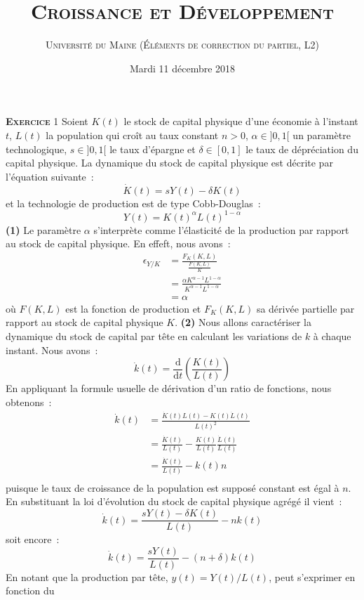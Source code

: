 \documentclass[10pt,a4paper,notitlepage,twocolumn]{article}
\newcommand{\exercice}[1]{\textsc{\textbf{Exercice}} #1}
\newcommand{\question}[1]{\textbf{(#1)}}
\begin{document}
\title{\textsc{Croissance et Développement}}
\author{\textsc{Université du Maine (Éléments de correction du partiel, L2)}}
\date{Mardi 11 décembre 2018}

\maketitle
\thispagestyle{empty}


\exercice{1} Soient $K(t)$ le stock de capital physique d'une économie
à l'instant $t$, $L(t)$ la population qui croît au taux constant
$n>0$, $\alpha\in]0,1[$ un paramètre technologique, $s\in]0,1[$ le
taux d'épargne et $\delta\in[0,1]$ le taux de dépréciation du capital
physique. La dynamique du stock de capital physique est décrite par
l'équation suivante :
\[
\dot K(t) = sY(t)-\delta K(t)
\]
et la technologie de production est de type Cobb-Douglas :
\[
Y(t) = K(t)^\alpha L(t)^{1-\alpha}
\]
\question{1} Le paramètre $\alpha$ s'interprète comme l'élasticité de
la production par rapport au stock de capital physique. En effeft,
nous avons :
\[
  \begin{split}
    \epsilon_{Y/K} &= \frac{F_{K}(K,L)}{\frac{F(K,L)}{K}}\\
  &= \frac{\alpha K^{\alpha-1}L^{1-\alpha}}{K^{\alpha-1}L^{1-\alpha}}\\
  &= \alpha
\end{split}
\]
où $F(K,L)$ est la fonction de production et $F_{K}(K,L)$ sa dérivée
partielle par rapport au stock de capital physique $K$. \question{2}
Nous allons caractériser la dynamique du stock de capital par tête en
calculant les variations de $k$ à chaque instant. Nous avons :
\[
\dot k(t) = \frac{\mathrm d}{\mathrm dt} \left(\frac{K(t)}{L(t)}\right)
\]
En appliquant la formule usuelle de dérivation d'un ratio de
fonctions, nous obtenons :
\[
  \begin{split}
    \dot k(t) &= \frac{\dot K(t)L(t)-K(t)\dot L(t)}{L(t)^{2}}\\
    &= \frac{\dot K(t)}{L(t)} - \frac{K(t)}{L(t)}\frac{\dot L(t)}{L(t)}\\
    &= \frac{\dot K(t)}{L(t)} - k(t) n \\
  \end{split}
\]
puisque le taux de croissance de la population est supposé constant
est égal à $n$. En substituant la loi d'évolution du stock de capital
physique agrégé il vient :
\[
\dot k(t) =  \frac{sY(t)-\delta K(t)}{L(t)} - n k(t)
\]
soit encore :
\[
\dot k(t) =  \frac{sY(t)}{L(t)} - (n+\delta) k(t)
\]
En notant que la production par tête, $y(t)=Y(t)/L(t)$, peut s'exprimer en fonction du
\end{document}
